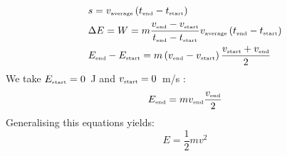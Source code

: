 \begin{align}
& s = v_{\mbox{\begin{tiny}average\end{tiny}}}\left( t_{\mbox{\begin{tiny}end\end{tiny}}} - t_{\mbox{\begin{tiny}start\end{tiny}}} \right) \\
& \Delta E = W = m \frac{v_{\mbox{\begin{tiny}end\end{tiny}}} - v_{\mbox{\begin{tiny}start\end{tiny}}}}{t_{\mbox{\begin{tiny}end\end{tiny}}} - t_{\mbox{\begin{tiny}start\end{tiny}}}} v_{\mbox{\begin{tiny}average\end{tiny}}}\left( t_{\mbox{\begin{tiny}end\end{tiny}}} - t_{\mbox{\begin{tiny}start\end{tiny}}} \right) \\
& E_{\mbox{\begin{tiny}end\end{tiny}}} - E_{\mbox{\begin{tiny}start\end{tiny}}} = m \left( v_{\mbox{\begin{tiny}end\end{tiny}}} - v_{\mbox{\begin{tiny}start\end{tiny}}} \right) \frac{v_{\mbox{\begin{tiny}start\end{tiny}}} + v_{\mbox{\begin{tiny}end\end{tiny}}}}{2}
\end{align}
We take $E_{\mbox{\begin{tiny}start\end{tiny}}}=0$~J and $v_{\mbox{\begin{tiny}start\end{tiny}}}=0$~m/s :
\begin{equation}
E_{\mbox{\begin{tiny}end\end{tiny}}} = m v_{\mbox{\begin{tiny}end\end{tiny}}} \frac{v_{\mbox{\begin{tiny}end\end{tiny}}}}{2}
\end{equation}
Generalising this equations yields:
\begin{equation}
E=\frac{1}{2}mv^2 \label{eq:Ekin}
\end{equation}

